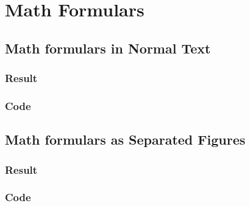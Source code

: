 \renewcommand\example[2]{\subsection{#1}\subsubsection{Result}\subsubsection{Code}}
\section{Math Formulars}
\example{Math formulars in Normal Text}{simple_inline.tex}
\example{Math formulars as Separated Figures}{simple_figure.tex}
